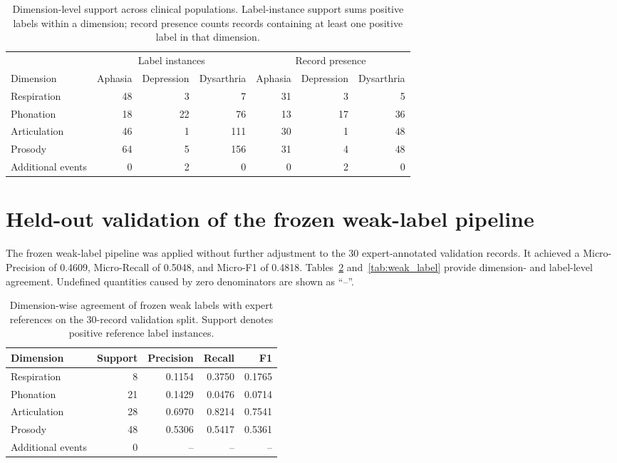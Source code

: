 \documentclass[10pt]{article}
\begin{document}
\begin{table}[h]
\centering
\caption{Dimension-level support across clinical populations. Label-instance support sums positive labels within a dimension; record presence counts records containing at least one positive label in that dimension.}
\label{tab:pop_dim_support}
\scriptsize
\begin{tabular}{lrrrrrr}
\toprule
& \multicolumn{3}{c}{Label instances} & \multicolumn{3}{c}{Record presence} \\
\cmidrule(lr){2-4}\cmidrule(lr){5-7}
Dimension & Aphasia & Depression & Dysarthria & Aphasia & Depression & Dysarthria \\
\midrule
Respiration & 48 & 3 & 7 & 31 & 3 & 5 \\
Phonation & 18 & 22 & 76 & 13 & 17 & 36 \\
Articulation & 46 & 1 & 111 & 30 & 1 & 48 \\
Prosody & 64 & 5 & 156 & 31 & 4 & 48 \\
Additional events & 0 & 2 & 0 & 0 & 2 & 0 \\
\bottomrule
\end{tabular}
\end{table}

\section{Held-out validation of the frozen weak-label pipeline}
The frozen weak-label pipeline was applied without further adjustment to the 30 expert-annotated validation records. It achieved a Micro-Precision of 0.4609, Micro-Recall of 0.5048, and Micro-F1 of 0.4818. Tables~\ref{tab:weak_dim} and~\ref{tab:weak_label} provide dimension- and label-level agreement. Undefined quantities caused by zero denominators are shown as ``--''.

\begin{table}[h]
\centering
\caption{Dimension-wise agreement of frozen weak labels with expert references on the 30-record validation split. Support denotes positive reference label instances.}
\label{tab:weak_dim}
\scriptsize
\begin{tabular}{lrrrr}
\toprule
Dimension & Support & Precision & Recall & F1 \\
\midrule
Respiration & 8 & 0.1154 & 0.3750 & 0.1765 \\
Phonation & 21 & 0.1429 & 0.0476 & 0.0714 \\
Articulation & 28 & 0.6970 & 0.8214 & 0.7541 \\
Prosody & 48 & 0.5306 & 0.5417 & 0.5361 \\
Additional events & 0 & -- & -- & -- \\
\bottomrule
\end{tabular}
\end{table}
\end{document}
